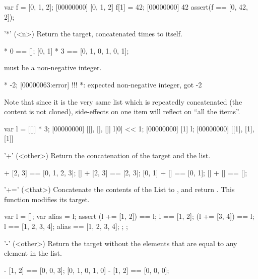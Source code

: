 \begin{urbiscriptapi}
\begin{urbiscript}
var f = [0, 1, 2];
[00000000] [0, 1, 2]
f[1] = 42;
[00000000] 42
assert(f == [0, 42, 2]);
\end{urbiscript}

\item['*'](<n>)%
  Return the target, concatenated  times to itself.
\begin{urbiassert}
[0, 1] * 0 == [];
[0, 1] * 3 == [0, 1, 0, 1, 0, 1];
\end{urbiassert}

   must be a non-negative integer.

\begin{urbiscript}
[0, 1] * -2;
[00000063:error] !!! *: expected non-negative integer, got -2
\end{urbiscript}


  Note that since it is the very same list which is repeatedly
  concatenated (the content is not cloned), side-effects on one item
  will reflect on ``all the items''.

\begin{urbiscript}
var l = [[]] * 3;
[00000000] [[], [], []]
l[0] << 1;
[00000000] [1]
l;
[00000000] [[1], [1], [1]]
\end{urbiscript}

\item['+'](<other>)%
  Return the concatenation of the target and the  list.

\begin{urbiassert}
[0, 1] + [2, 3] == [0, 1, 2, 3];
[] + [2, 3] == [2, 3];
[0, 1] + [] == [0, 1];
[] + [] == [];
\end{urbiassert}

\item['+='](<that>)%
  Concatenate the contents of the List  to \this, and return
  \this.  This function modifies its target.

\begin{urbiscript}
{
  var l = [];
  var alias = l;
  assert
  {
    (l += [1, 2]) == l;
    l == [1, 2];
    (l += [3, 4]) == l;
    l == [1, 2, 3, 4];
    alias == [1, 2, 3, 4];
  };
};
\end{urbiscript}

\item['-'](<other>)%
  Return the target without the elements that are equal to any element
  in the  list.

\begin{urbiassert}
[0, 1, 0, 2, 3] - [1, 2] == [0, 0, 3];
[0, 1, 0, 1, 0] - [1, 2] == [0, 0, 0];
\end{urbiassert}


\end{urbiscriptapi}
